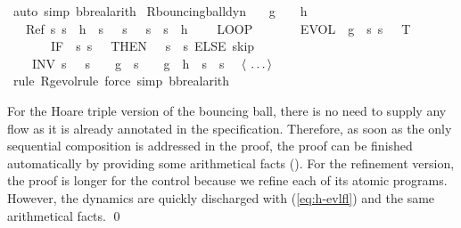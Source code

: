 \documentclass[envcountsame,envcountsect]{llncs}
\begin{document}
\begin{example}
\begin{isabellebody}
\ {\isacharparenleft}auto\ simp{\isacharcolon}\ bb{\isacharunderscore}real{\isacharunderscore}arith{\isacharparenright}\isanewline
\isanewline
{}\isamarkupfalse%
\ R{\isacharunderscore}bouncing{\isacharunderscore}ball{\isacharunderscore }dyn{\isacharcolon}\isanewline
\ \ \ {\isachardoublequoteopen}g\ {\isacharless}\ {}{\isachardoublequoteclose}\ \ {\isachardoublequoteopen}h\ {\isasymge}\ {}{\isachardoublequoteclose}\isanewline
\ \ \ {\isachardoublequoteopen}Ref\ {\isasymlceil}{\isasymlambda}s{\isachardot}\ s{\isachardollar}{}\ {\isacharequal}\ h\ {\isasymand}\ s{\isachardollar}{}\ {\isacharequal}\ {}{\isasymrceil}\ {\isasymlceil}{\isasymlambda}s{\isachardot}\ {}\ {\isasymle}\ s{\isachardollar}{}\ {\isasymand}\ s{\isachardollar}{}\ {\isasymle}\ h{\isasymrceil}\ {\isasymge}\ \isanewline
\ \ {\isacharparenleft}LOOP\ \isanewline
\ \ \ \ \ \ {\isacharparenleft}{\isacharparenleft}EVOL\ {\isacharparenleft}{\isasymphi}\ g{\isacharparenright}\ {\isacharparenleft}{\isasymlambda}\ s{\isachardot}\ s{\isachardollar}{}\ {\isasymge}\ {}{\isacharparenright}\ T{\isacharparenright}{\isacharsemicolon}\isanewline
\ \ \ \ \ \ \ {\isacharparenleft}IF\ {\isacharparenleft}{\isasymlambda}\ s{\isachardot}\ s{\isachardollar}{}\ {\isacharequal}\ {}{\isacharparenright}\ THEN\ {\isacharparenleft}{}\ {\isacharcolon}{\isacharcolon}{\isacharequal}\ {\isacharparenleft}{\isasymlambda}s{\isachardot}\ {\isacharminus}\ s{\isachardollar}{}{\isacharparenright}{\isacharparenright}\ ELSE\ skip{\isacharparenright}{\isacharparenright}\ \isanewline
\ \ \ \ INV\ {\isacharparenleft}{\isasymlambda}s{\isachardot}\ {}\ {\isasymle}\ s{\isachardollar}{}\ {\isasymand}\ {}\ {\isasymcdot}\ g\ {\isasymcdot}\ s{\isachardollar}{}\ {\isacharequal}\ {}\ {\isasymcdot}\ g\ {\isasymcdot}\ h\ {\isacharplus}\ s{\isachardollar}{}\ {\isasymcdot}\ s{\isachardollar}{}{\isacharparenright}{\isacharparenright}{\isachardoublequoteclose}\isanewline
\ \ $\langle \isa{\dots}\rangle$\ \isamarkupfalse%
\ {\isacharparenleft}rule\ R{\isacharunderscore}g{\isacharunderscore}evol{\isacharunderscore}rule{\isacharcomma}\ force\ simp{\isacharcolon}\ bb{\isacharunderscore}real{\isacharunderscore}arith{\isacharparenright} \isanewline
\end{isabellebody}

For the Hoare triple version of the bouncing ball, there is no need to supply any flow as it is already annotated in the specification. Therefore, as soon as the only sequential composition is addressed in the proof, the proof can be finished automatically by providing some arithmetical facts (). For the refinement version, the proof is longer for the control because we refine each of its atomic programs. However, the dynamics are quickly discharged with (\ref{eq:h-evlfl}) and the same arithmetical facts. \qed
\end{example}
\end{document}
